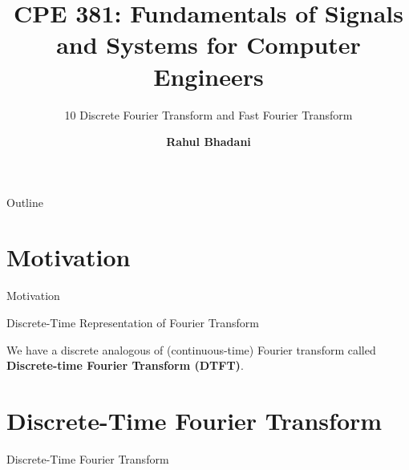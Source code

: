 \documentclass[aspectratio=169,xcolor=dvipsnames,svgnames,x11names,fleqn]{beamer}
\title[CPE 381: Signals and Systems]{CPE 381: Fundamentals of Signals and Systems for Computer Engineers} %
\subtitle{10 Discrete Fourier Transform and Fast Fourier Transform}
\author[Rahul Bhadani] {{\Large \textbf{Rahul Bhadani}}}
\institute[UAH] %
{
    Electrical \& Computer Engineering,  The University of Alabama in Huntsville
}
\date
\begin{document}
\begin{frame}
\titlepage
\end{frame}

\begin{frame}{Outline}
    \tableofcontents
\end{frame}



\section{Motivation}


\begin{frame}{}
    \begin{center}
    \Huge \bf \color{DarkBlue}
    \faFire
    
    Motivation
\end{center}
\end{frame}

\begin{frame}{Discrete-Time Representation of Fourier Transform}

\begin{center}
    We have a discrete analogous of (continuous-time) Fourier transform called \textbf{Discrete-time Fourier Transform (DTFT)}.
\end{center}
    
\end{frame}

\section{Discrete-Time Fourier Transform}


\begin{frame}{}
    \begin{center}
    \Huge \bf \color{DarkBlue}
    \faFire
    
    Discrete-Time Fourier Transform
\end{center}
\end{frame}
\end{document}

